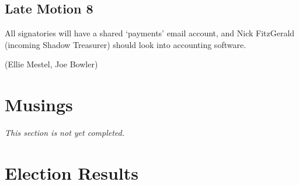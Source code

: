 \documentclass[a4paper, 11pt]{article} %
\begin{document}
\subsection{Late Motion 8}

All signatories will have a shared `payments' email account, and Nick FitzGerald (incoming Shadow Treasurer) should look into accounting software.

(Ellie Mestel, Joe Bowler)

\section{Musings}

\emph{This section is not yet completed.}

\section{Election Results}
\end{document}
